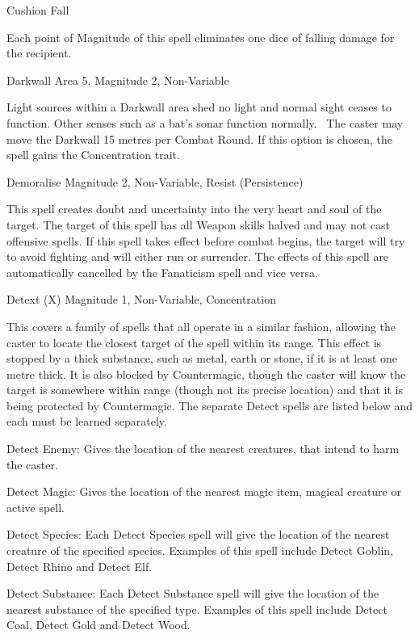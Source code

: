 \begin{rpg-spell}
{Cushion Fall}
{}

Each point of Magnitude of this spell eliminates one dice of falling damage for the recipient.
\end{rpg-spell}


\begin{rpg-spell}
{Darkwall}
{Area 5, Magnitude 2, Non-Variable}

Light sources within a Darkwall area shed no light and normal sight ceases to function. Other senses such as a bat’s sonar function normally. 
The caster may move the Darkwall 15 metres per Combat Round. If this option is chosen, the spell gains the Concentration trait. 
\end{rpg-spell}


\begin{rpg-spell}
{Demoralise}
{Magnitude 2, Non-Variable, Resist (Persistence)}

This spell creates doubt and uncertainty into the very heart and soul of the target. The target of this spell has all Weapon skills halved and may not cast offensive spells. If this spell takes effect before combat begins, the target will try to avoid fighting and will either run or surrender. The effects of this spell are automatically cancelled by the Fanaticism spell and vice versa. 
\end{rpg-spell}


\begin{rpg-spell}
{Detext (X)}
{Magnitude 1, Non-Variable, Concentration}

This covers a family of spells that all operate in a similar fashion, allowing the caster to locate the closest target of the spell within its range. This effect is stopped by a thick substance, such as metal, earth or stone, if it is at least one metre thick. It is also blocked by Countermagic, though the caster will know the target is somewhere within range (though not its precise location) and that it is being protected by Countermagic. The separate Detect spells are listed below and each must be learned separately.

\begin{rpg-list}
\item Detect Enemy: Gives the location of the nearest creatures, that intend to harm the caster. 
\item Detect Magic: Gives the location of the nearest magic item, magical creature or active spell. 
\item Detect Species: Each Detect Species spell will give the location of the nearest creature of the specified species. Examples of this spell include Detect Goblin, Detect Rhino and Detect Elf. 
\item Detect Substance: Each Detect Substance spell will give the location of the nearest substance of the specified type. Examples of this spell include Detect Coal, Detect Gold and Detect Wood. 
\end{rpg-list}
\end{rpg-spell}


